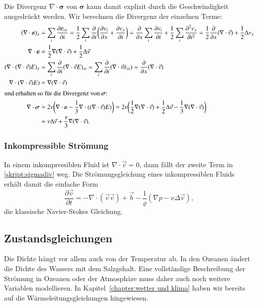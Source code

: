 Die Divergenz $\nabla\cdot\bm{\sigma}$ von $\bm{\sigma}$ kann damit explizit
durch die Geschwindigkeit ausgedrückt werden.
Wir berechnen die Divergenz der einzelnen Terme:
\begin{align}
(\nabla\cdot\bm{\varepsilon})_x
&=
\sum_i\frac{\partial \varepsilon_{ix}}{\partial i}
=
\frac12
\sum_i\frac{\partial}{\partial i}\biggl(
\frac{\partial v_i}{\partial x}+\frac{\partial v_x}{\partial i}
\biggr)
=
\frac{\partial}{\partial x}
\sum_i\frac{\partial v_i}{\partial i}
+
\frac12
\sum_i \frac{\partial^2 v_x}{\partial i^2}
=
\frac12\frac{\partial}{\partial x}
(\nabla\cdot\vec{v})
+
\frac12\Delta v_x
\notag
\\
\nabla\cdot\bm{\varepsilon}
&=
\frac12\nabla(\nabla\cdot\vec{v})
+
\frac12\Delta\vec{v}
\notag
\\
(\nabla\cdot(\nabla\cdot\vec{v})E)_x
&=
\sum_i \frac{\partial}{\partial i} (\nabla\cdot\vec{v}E)_{xi}
=
\sum_i \frac{\partial}{\partial i} (\nabla\cdot\vec{v}\delta_{xi})
=
\frac{\partial}{\partial x}(\nabla\cdot\vec{v})
\notag
\\
\nabla\cdot(\nabla\cdot\vec{v})E)
&=
\nabla(\nabla\cdot\vec v)
\notag
\\
\intertext{und erhalten so für die Divergenz von $\bm{\sigma}$:}
\nabla\cdot\bm{\sigma}
&=
2\nu\biggl(
\nabla\cdot\bm{\varepsilon}
-\frac13\nabla\cdot((\nabla\cdot\vec{v})E)
\biggr)
=
2\nu\biggl(
\frac12
\nabla(\nabla\cdot\vec{v})
+
\frac12\Delta\vec{v}
-\frac13
\nabla(\nabla\cdot\vec{v})
\biggr)
\\
&=
\nu\Delta\vec{v}
+\frac{\nu}3\nabla(\nabla\cdot\vec{v}).
\label{skript:sigmadiv}
\end{align}

\subsubsection{Inkompressible Strömung}
In einem inkompressiblen Fluid ist $\nabla\cdot\vec{v}=0$, dann fällt
der zweite Term in \eqref{skript:sigmadiv} weg.
Die Strömungsgleichung eines inkompressiblen Fluids erhält damit die
einfache Form
\begin{equation}
\frac{\partial\vec{v}}{\partial t}
=
-\nabla\cdot(\vec{v}\vec{v})
+\vec{b}
-\frac1{\varrho}(\nabla p
-\nu\Delta\vec{v}),
\label{skript:inkompressibel newtonsch}
\end{equation}
die klassische Navier-Stokes Gleichung.

\subsection{Zustandsgleichungen}
Die Dichte hängt vor allem auch von der Temperatur ab.
In den Ozeanen ändert die Dichte des Wassers mit dem Salzgehalt.
Eine vollständige Beschreibung der Strömung in Ozeanen oder der
Atmosphäre muss daher auch noch weitere Variablen modellieren.
In Kapitel~\ref{chapter:wetter und klima} haben wir bereits auf die
Wärmeleitungsgleichungen hingewiesen.

